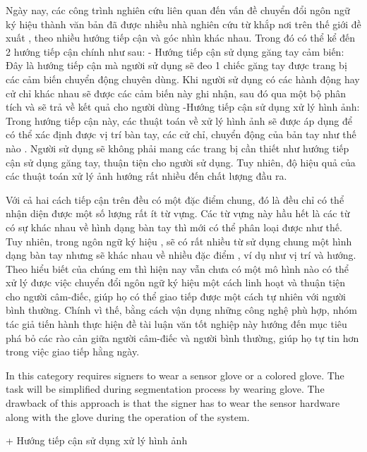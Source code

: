   Ngày nay, các công trình nghiên cứu liên quan đến vấn đề chuyển đổi ngôn ngữ
  ký hiệu thành văn bản đã được nhiều nhà nghiên cứu từ khắp nơi trên thế giới đề xuất
  , theo nhiều hướng tiếp cận và góc nhìn khác nhau. Trong đó có thể kể đến 2 hướng
  tiếp cận chính như sau:
    - Hướng tiếp cận sử dụng găng tay cảm biến:
        Đây là hướng tiếp cận mà người sử dụng sẽ đeo 1 chiếc găng tay được trang bị
        các cảm biến chuyển động chuyên dùng. Khi người sử dụng có các hành động hay
        cử chỉ khác nhau sẽ được các cảm biến này ghi nhận, sau đó qua một bộ phân
        tích và sẽ trả về kết quả cho người dùng
    -Hướng tiếp cận sử dụng xử lý hình ảnh:
        Trong hướng tiếp cận này, các thuật toán về xử lý hình ảnh sẽ được áp dụng để
        có thể xác định được vị trí bàn tay, các cử chỉ, chuyển động của bản tay như thế nào
        . Người sử dụng sẽ không phải mang các trang bị cần thiết như hướng tiếp cận sử 
        dụng găng tay, thuận tiện cho người sử dụng. Tuy nhiên,
        độ hiệu quả của các thuật toán xử lý ảnh hướng rất nhiều đến chất lượng đầu ra.

  Với cả hai cách tiếp cận trên đều có một đặc điểm chung, đó là đều chỉ có thể
  nhận diện được một số lượng rất ít từ vựng. Các từ vựng này hầu hết là các từ có sự khác nhau
  về hình dạng bàn tay thì mới có thể phân loại được như thế. Tuy nhiên, trong ngôn ngữ ký hiệu
  , sẽ có rất nhiều từ sử dụng chung một hình dạng bàn tay nhưng sẽ khác nhau về nhiều đặc điểm
  , ví dụ như vị trí và hướng. Theo hiểu biết của chúng em thì hiện nay vẫn chưa có một mô hình nào
  có thể xử lý được việc chuyển đổi ngôn ngữ ký hiệu một cách linh hoạt và thuận tiện cho người câm-điếc,
  giúp họ có thể giao tiếp được một cách tự nhiên với người bình thường. Chính vì thế, bằng cách vận dụng những công nghệ
  phù hợp, nhóm tác giả tiến hành thực hiện đề tài luận văn tốt nghiệp này hướng đến mục tiêu phá bỏ các rào cản
  giữa người câm-điếc và người bình thường, giúp họ tự tin hơn trong việc giao tiếp hằng ngày.



In this category requires signers to wear a sensor glove or a
colored glove. The task will be simplified during
segmentation process by wearing glove. The drawback of this
approach is that the signer has to wear the sensor hardware
along with the glove during the operation of the system.

    + Hướng tiếp cận sử dụng xử lý hình ảnh
